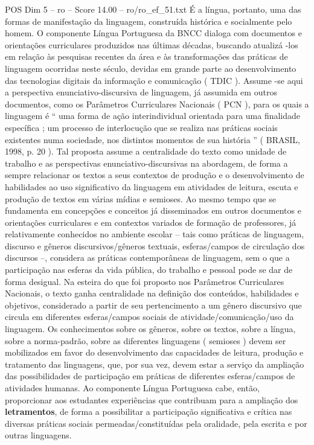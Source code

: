 \begin{textsample}{POS Dim 5 – ro – Score 14.00 – ro/ro\_ef\_51.txt}
É a língua, portanto, uma das formas de manifestação da linguagem, construída histórica e socialmente pelo homem.
O componente Língua Portuguesa da BNCC dialoga com documentos e orientações curriculares produzidos nas últimas décadas, buscando atualizá -los em relação às pesquisas recentes da área e às transformações das práticas de linguagem ocorridas neste século, devidas em grande parte ao desenvolvimento das tecnologias digitais da informação e comunicação ( TDIC ).
Assume -se aqui a perspectiva enunciativo-discursiva de linguagem, já assumida em outros documentos, como os Parâmetros Curriculares Nacionais ( PCN ), para os quais a linguagem é “ uma forma de ação interindividual orientada para uma finalidade específica ; um processo de interlocução que se realiza nas práticas sociais existentes numa sociedade, nos distintos momentos de sua história ” ( BRASIL, 1998, p. 20 ).
Tal proposta assume a centralidade do texto como unidade de trabalho e as perspectivas enunciativo-discursivas na abordagem, de forma a sempre relacionar os textos a seus contextos de produção e o desenvolvimento de habilidades ao uso significativo da linguagem em atividades de leitura, escuta e produção de textos em várias mídias e semioses.
Ao mesmo tempo que se fundamenta em concepções e conceitos já disseminados em outros documentos e orientações curriculares e em contextos variados de formação de professores, já relativamente conhecidos no ambiente escolar – tais como práticas de linguagem, discurso e gêneros discursivos/gêneros textuais, esferas/campos de circulação dos discursos –, considera as práticas contemporâneas de linguagem, sem o que a participação nas esferas da vida pública, do trabalho e pessoal pode se dar de forma desigual.
Na esteira do que foi proposto nos Parâmetros Curriculares Nacionais, o texto ganha centralidade na definição dos conteúdos, habilidades e objetivos, considerado a partir de seu pertencimento a um gênero discursivo que circula em diferentes esferas/campos sociais de atividade/comunicação/uso da linguagem.
Os conhecimentos sobre os gêneros, sobre os textos, sobre a língua, sobre a norma-padrão, sobre as diferentes linguagens ( semioses ) devem ser mobilizados em favor do desenvolvimento das capacidades de leitura, produção e tratamento das linguagens, que, por sua vez, devem estar a serviço da ampliação das possibilidades de participação em práticas de diferentes esferas/campos de atividades humanas.
Ao componente Língua Portuguesa cabe, então, proporcionar aos estudantes experiências que contribuam para a ampliação dos \textbf{letramentos}, de forma a possibilitar a participação significativa e crítica nas diversas práticas sociais permeadas/constituídas pela oralidade, pela escrita e por outras linguagens.

\end{textsample}
